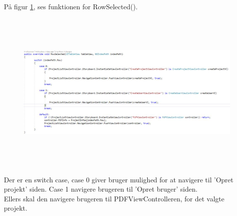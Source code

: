På figur \ref{fig:RowSelection}, ses funktionen for RowSelected().
\begin{figure}[H] %
	\centering
	\includegraphics[height=8cm, width=17cm]{../ArkitekturDesign/Design/ProjectList/RowSelection}
	\caption{}
	\label{fig:RowSelection}
\end{figure}
Der er en switch case, case 0 giver bruger mulighed for at navigere til 'Opret projekt' siden. Case 1 navigere brugeren til 'Opret bruger' siden. \\
Ellers skal den navigere brugeren til PDFViewControlleren, for det valgte projekt.

\clearpage
